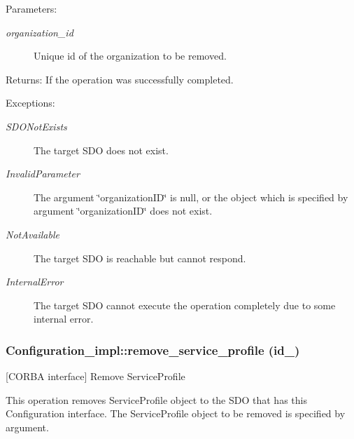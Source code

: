 \begin{Desc}
\item[Parameters:]
\begin{description}
\item[{\em organization\_\-id}]Unique id of the organization to be removed. \end{description}
\end{Desc}
\begin{Desc}
\item[Returns:]If the operation was successfully completed. \end{Desc}
\begin{Desc}
\item[Exceptions:]
\begin{description}
\item[{\em SDONot\-Exists}]The target SDO does not exist. \item[{\em Invalid\-Parameter}]The argument \char`\"{}organization\-ID\char`\"{} is null, or the object which is specified by argument \char`\"{}organization\-ID\char`\"{} does not exist. \item[{\em Not\-Available}]The target SDO is reachable but cannot respond. \item[{\em Internal\-Error}]The target SDO cannot execute the operation completely due to some internal error.\end{description}
\end{Desc}
\subsubsection{\setlength{\rightskip}{0pt plus 5cm}Configuration\_\-impl::remove\_\-service\_\-profile (id\_\-)}\label{classConfiguration__impl_Configuration__impla4}


[CORBA interface] Remove Service\-Profile 

This operation removes Service\-Profile object to the SDO that has this Configuration interface. The Service\-Profile object to be removed is specified by argument.


